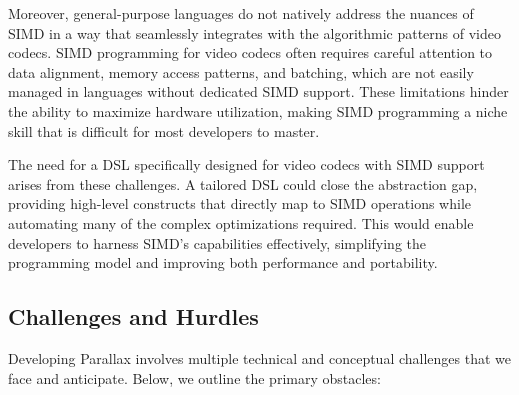 \documentclass[12pt,a4paper]{article}
\begin{document}
Moreover, general-purpose languages do not natively address the nuances of SIMD in a way that seamlessly integrates with the algorithmic patterns of video codecs. SIMD programming for video codecs often requires careful attention to data alignment, memory access patterns, and batching, which are not easily managed in languages without dedicated SIMD support. These limitations hinder the ability to maximize hardware utilization, making SIMD programming a niche skill that is difficult for most developers to master.

The need for a DSL specifically designed for video codecs with SIMD support arises from these challenges. A tailored DSL could close the abstraction gap, providing high-level constructs that directly map to SIMD operations while automating many of the complex optimizations required. This would enable developers to harness SIMD's capabilities effectively, simplifying the programming model and improving both performance and portability.

\subsection{Challenges and Hurdles}

Developing Parallax involves multiple technical and conceptual challenges that we face and anticipate. Below, we outline the primary obstacles:
\end{document}
